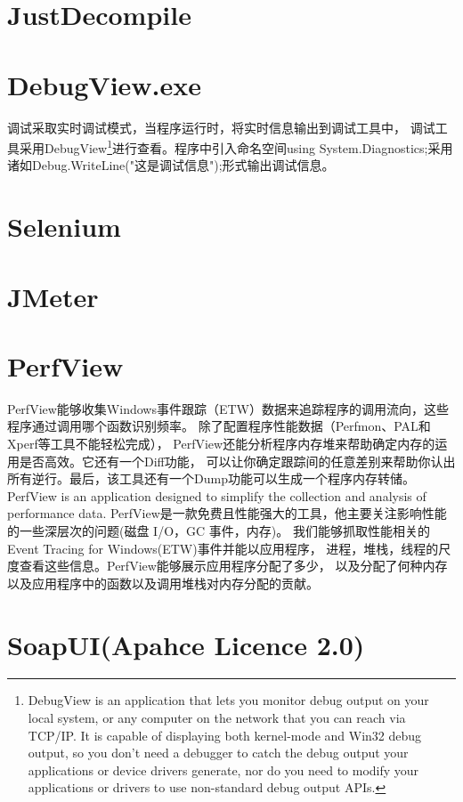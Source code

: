 \documentclass{book}
\begin{document}
\section{JustDecompile}

\section{DebugView.exe}

调试采取实时调试模式，当程序运行时，将实时信息输出到调试工具中，
调试工具采用DebugView\footnote{DebugView is an application that lets you monitor debug output on your local system, or any computer on the network that you can reach via TCP/IP. It is capable of displaying both kernel-mode and Win32 debug output, so you don't need a debugger to catch the debug output your applications or device drivers generate, nor do you need to modify your applications or drivers to use non-standard debug output APIs.}进行查看。程序中引入命名空间using System.Diagnostics;采用诸如Debug.WriteLine("这是调试信息");形式输出调试信息。

\section{Selenium}

\section{JMeter}

\section{PerfView}

PerfView能够收集Windows事件跟踪（ETW）数据来追踪程序的调用流向，这些程序通过调用哪个函数识别频率。
除了配置程序性能数据（Perfmon、PAL和Xperf等工具不能轻松完成），
PerfView还能分析程序内存堆来帮助确定内存的运用是否高效。它还有一个Diff功能，
可以让你确定跟踪间的任意差别来帮助你认出所有逆行。最后，该工具还有一个Dump功能可以生成一个程序内存转储。
PerfView is an application designed to simplify the collection and analysis of performance data.
PerfView是一款免费且性能强大的工具，他主要关注影响性能的一些深层次的问题(磁盘 I/O，GC 事件，内存)。
我们能够抓取性能相关的 Event Tracing for Windows(ETW)事件并能以应用程序，
进程，堆栈，线程的尺度查看这些信息。PerfView能够展示应用程序分配了多少，
以及分配了何种内存以及应用程序中的函数以及调用堆栈对内存分配的贡献。

\section{SoapUI(Apahce Licence 2.0)}
\end{document}
